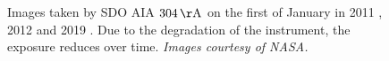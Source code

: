\documentclass[11pt,a4paper,onecolumn]{report}
\begin{document}
\begin{figure}[t]%
  \centering
  \qquad
  \qquad
  \caption[]{Images taken by SDO AIA $\SI[]{304}[]{\AA}$ on the first of January in 2011
    , 2012  and 2019
    . Due to the degradation of the instrument, the
    exposure reduces over time. \textit{Images courtesy of NASA.}}
  \label{fig:aia_degradation}
\end{figure}
\end{document}
